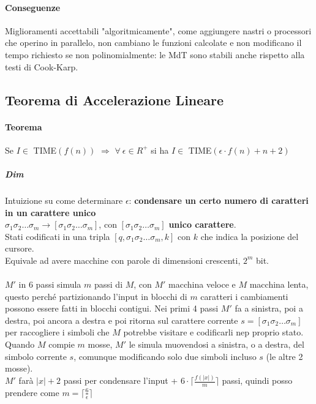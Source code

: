 \documentclass[10pt]{book}
\begin{document}
\paragraph{Conseguenze} Miglioramenti accettabili "algoritmicamente", come aggiungere nastri o processori che operino in parallelo, non cambiano le funzioni calcolate e non modificano il tempo richiesto se non polinomialmente: le MdT sono stabili anche rispetto alla testi di Cook-Karp.
\subsection{Teorema di Accelerazione Lineare}
\paragraph{Teorema} Se $I \in$ TIME$(f(n))$ $\Rightarrow$ $\forall\: \epsilon \in R^+$ si ha $I\in$ TIME$(\epsilon\cdot f(n) + n + 2)$
\subparagraph{Dim} Intuizione su come determinare $\epsilon$:  \textbf{condensare un certo numero di caratteri in un carattere unico}\\
	$\sigma_1 \sigma_2 \ldots \sigma_m \longrightarrow [\sigma_1 \sigma_2 \ldots \sigma_m]$, con $[\sigma_1 \sigma_2 \ldots \sigma_m]$ \textbf{unico carattere}.\\
	Stati codificati in una tripla $[q, \sigma_1 \sigma_2 \ldots \sigma_m, k]$ con $k$ che indica la posizione del cursore.\\
	Equivale ad avere macchine con parole di dimensioni crescenti, $2^m$ bit.\\\\
$M'$ in 6 passi simula $m$ passi di $M$, con $M'$ macchina veloce e $M$ macchina lenta, questo perché partizionando l'input in blocchi di $m$ caratteri i cambiamenti possono essere fatti in blocchi contigui. Nei primi 4 passi $M'$ fa a sinistra, poi a destra, poi ancora a destra e poi ritorna sul carattere corrente $s = [\sigma_1\sigma_2\ldots\sigma_m]$ per raccogliere i simboli che $M$ potrebbe visitare e codificarli nep proprio stato. Quando $M$ compie $m$ mosse, $M'$ le simula muovendosi a sinistra, o a destra, del simbolo corrente $s$, comunque modificando solo due simboli incluso $s$ (le altre 2 mosse).\\
$M'$ farà $|x|+2$ passi per condensare l'input + $6\cdot \lceil \frac{f(|x|)}{m} \rceil$ passi, quindi posso prendere come $m = \lceil \frac{6}{\epsilon} \rceil$
\end{document}
